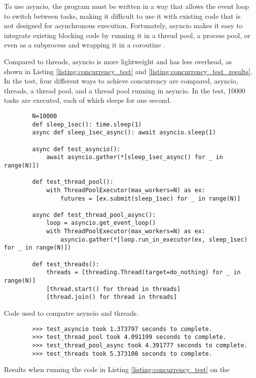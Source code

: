 To use \gls{asyncio}, the program must be written in a way that allows the event loop to switch between tasks, making it difficult to use it with existing code that is not designed for asynchronous execution.
Fortunately, \gls{asyncio} makes it easy to integrate existing blocking code by running it in a thread pool, a process pool, or even as a subprocess and wrapping it in a coroutine \cite{pythonsoftwarefoundationAsyncioAsynchronous}.

Compared to threads, \gls{asyncio} is more lightweight and has less overhead, as shown in Listing \ref{listing:concurrency_test} and \ref{listing:concurrency_test_results}.
In the test, four different ways to achieve concurrency are compared, \gls{asyncio}, threads, a thread pool, and a thread pool running in \gls{asyncio}.
In the test, 10000 tasks are executed, each of which sleeps for one second.

\begin{listing}[H]
    \begin{verbatim}
        N=10000
        def sleep_1sec(): time.sleep(1)
        async def sleep_1sec_async(): await asyncio.sleep(1)

        async def test_asyncio():
            await asyncio.gather(*[sleep_1sec_async() for _ in range(N)])

        def test_thread_pool():
            with ThreadPoolExecutor(max_workers=N) as ex:
                futures = [ex.submit(sleep_1sec) for _ in range(N)]

        async def test_thread_pool_async():
            loop = asyncio.get_event_loop()
            with ThreadPoolExecutor(max_workers=N) as ex:
                asyncio.gather(*[loop.run_in_executor(ex, sleep_1sec) for _ in range(N)])

        def test_threads():
            threads = [threading.Thread(target=do_nothing) for _ in range(N)]
            [thread.start() for thread in threads]
            [thread.join() for thread in threads]
    \end{verbatim}
    \caption{Code used to compatre asyncio and threads.}
    \label{listing:concurrency_test}
\end{listing}
\begin{listing}[H]
    \begin{verbatim}
        >>> test_asyncio took 1.373797 seconds to complete.
        >>> test_thread_pool took 4.091199 seconds to complete.
        >>> test_thread_pool_async took 4.391777 seconds to complete.
        >>> test_threads took 5.373108 seconds to complete.
    \end{verbatim}
    \caption{Results when running the code in Listing  \ref{listing:concurrency_test} on the \jx}
    \label{listing:concurrency_test_results}
\end{listing}

